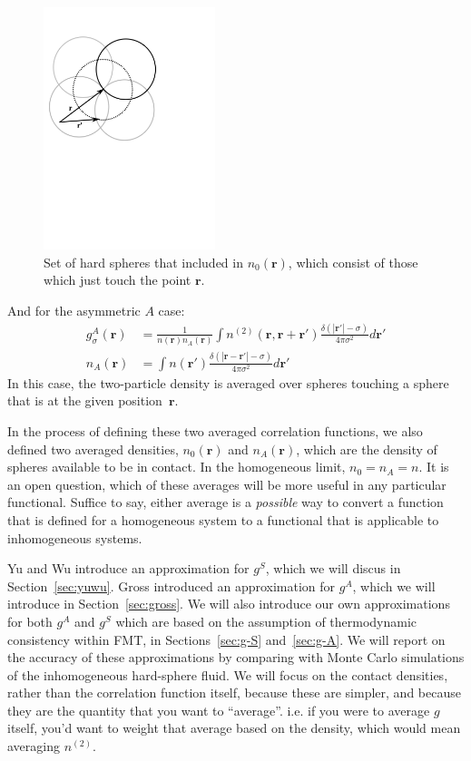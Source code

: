 \documentclass[letterpaper,twocolumn,amsmath,amssymb,jcp,10pt,aip]{revtex4-1}
\newcommand{\rr}{\textbf{r}}
\begin{document}
\begin{figure}
\includegraphics[width=5cm]{figs/n0}
\caption{Set of hard spheres that included in $n_0(\mathbf{r})$, which
  consist of those which just touch the point $\mathbf{r}$.}
\label{fig:n0}
\end{figure}

And for the asymmetric $A$ case:
\begin{align}
  g^A_\sigma(\rr) &= \frac{1}{n(\rr)n_A(\rr)}
  \int n^{(2)}(\rr, \rr + \rr')
  \frac{\delta(|\rr'| - \sigma)}{4\pi\sigma^2}d\rr' \label{eq:gA} \\
  n_A(\rr) &= \int n(\rr')
  \frac{\delta(|\rr-\rr'|-\sigma)}{4\pi\sigma^2} d\rr' \label{eq:nA}
\end{align}
In this case, the two-particle density is averaged over spheres
touching a sphere that is at the given position~$\rr$.

In the process of defining these two averaged correlation functions,
we also defined two averaged densities, $n_0(\rr)$ and $n_A(\rr)$,
which are the density of spheres available to be in
contact.  In the homogeneous limit, $n_0 = n_A = n$.  It is an
open question, which of these averages will be more useful in any
particular functional.  Suffice to say, either average is a
\emph{possible} way to convert a function that is defined for a
homogeneous system to a functional that is applicable to inhomogeneous
systems.

Yu and Wu introduce an approximation for
$g^S$\cite{yu2002fmt-dft-inhomogeneous-associating}, which we will
discus in Section~\ref{sec:yuwu}.  Gross introduced an
approximation for $g^A$\cite{gross2009density}, which we will
introduce in Section~\ref{sec:gross}.  We will also introduce our own
approximations for both $g^A$ and $g^S$ which are based on the
assumption of thermodynamic consistency within FMT, in
Sections~\ref{sec:g-S} and~\ref{sec:g-A}.  We will report on the accuracy of
these approximations by comparing with Monte Carlo simulations of the
inhomogeneous hard-sphere fluid.  We will focus on the contact
densities, rather than the correlation function itself, because these
are simpler, and because they are the quantity that you want to
``average''.  i.e. if you were to average $g$ itself, you'd want to
weight that average based on the density, which would mean averaging
$n^{(2)}$.
\end{document}
